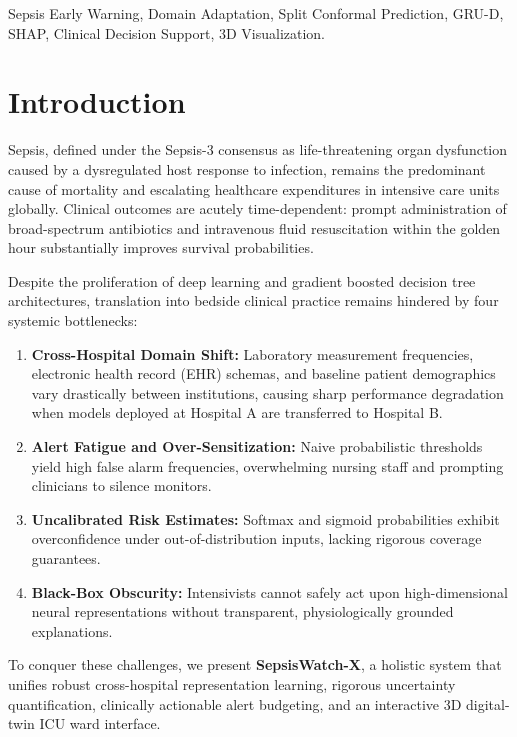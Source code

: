 \documentclass[conference]{IEEEtran}
\begin{document}
\begin{IEEEkeywords}
Sepsis Early Warning, Domain Adaptation, Split Conformal Prediction, GRU-D, SHAP, Clinical Decision Support, 3D Visualization.
\end{IEEEkeywords}

\section{Introduction}
Sepsis, defined under the Sepsis-3 consensus as life-threatening organ dysfunction caused by a dysregulated host response to infection, remains the predominant cause of mortality and escalating healthcare expenditures in intensive care units globally. Clinical outcomes are acutely time-dependent: prompt administration of broad-spectrum antibiotics and intravenous fluid resuscitation within the golden hour substantially improves survival probabilities.

Despite the proliferation of deep learning and gradient boosted decision tree architectures, translation into bedside clinical practice remains hindered by four systemic bottlenecks:
\begin{enumerate}
    \item \textbf{Cross-Hospital Domain Shift:} Laboratory measurement frequencies, electronic health record (EHR) schemas, and baseline patient demographics vary drastically between institutions, causing sharp performance degradation when models deployed at Hospital A are transferred to Hospital B.
    \item \textbf{Alert Fatigue and Over-Sensitization:} Naive probabilistic thresholds yield high false alarm frequencies, overwhelming nursing staff and prompting clinicians to silence monitors.
    \item \textbf{Uncalibrated Risk Estimates:} Softmax and sigmoid probabilities exhibit overconfidence under out-of-distribution inputs, lacking rigorous coverage guarantees.
    \item \textbf{Black-Box Obscurity:} Intensivists cannot safely act upon high-dimensional neural representations without transparent, physiologically grounded explanations.
\end{enumerate}

To conquer these challenges, we present \textbf{SepsisWatch-X}, a holistic system that unifies robust cross-hospital representation learning, rigorous uncertainty quantification, clinically actionable alert budgeting, and an interactive 3D digital-twin ICU ward interface.
\end{document}
